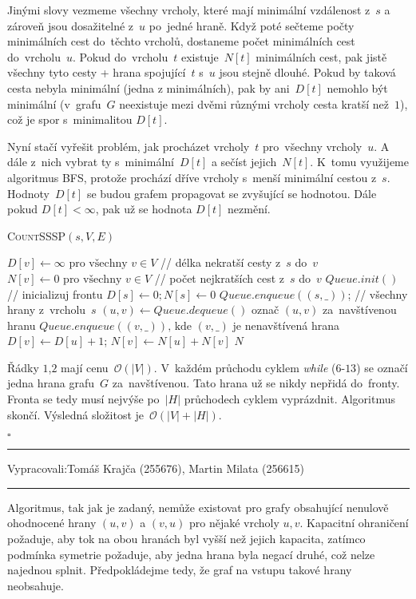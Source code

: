 \documentclass[12pt]{article}
\newcommand{\la}{\leftarrow}
\renewcommand{\O}{\mathcal{O}}
\newcommand{\zadani}[2]{
{\large
\noindent {\bf IB108 \hfill{} Sada #1, Příklad #2 \\[-4mm]}
\noindent\hrule
\vspace{2mm}
\noindent Vypracovali:\hfill{}Tomáš Krajča (255676), Martin Milata (256615)
\vspace{3mm}
\hrule
\bigskip\bigskip}
}
\begin{document}
\noindent
Jinými slovy vezmeme všechny vrcholy, které mají minimální vzdálenost z~$s$ a
zároveň jsou dosažitelné z~$u$ po~jedné hraně. Když poté sečteme počty
minimálních cest do~těchto vrcholů, dostaneme počet minimálních cest do~vrcholu~$u$. Pokud do~vrcholu~$t$ existuje~$N[t]$ minimálních cest, pak jistě všechny
tyto cesty + hrana spojující~$t$ s~$u$ jsou stejně dlouhé. Pokud by taková cesta
nebyla minimální (jedna z minimálních), pak by ani~$D[t]$ nemohlo být minimální
(v~grafu~$G$ neexistuje mezi dvěmi různými vrcholy cesta kratší než~$1$), což je
spor s~minimalitou $D[t]$.

\noindent
Nyní stačí vyřešit problém, jak procházet vrcholy~$t$ pro~všechny vrcholy~$u$. A dále z~nich vybrat ty s~minimální~$D[t]$ a sečíst jejich~$N[t]$. K~tomu
využijeme algoritmus \textsc{BFS}, protože prochází dříve vrcholy s~menší
minimální cestou z~$s$. Hodnoty~$D[t]$ se budou grafem propagovat se
zvyšující se hodnotou. Dále pokud $D[t] < \infty$, pak už se hodnota $D[t]$ nezmění.

\begin{algorithm}
\textsc{CountSSSP}$(s, V, E)$
\begin{algorithmic}[1]
\STATE $D[v] \la \infty \mbox{ pro všechny } v \in V$ // délka nekratší cesty z~$s$ do~$v$
\STATE $N[v] \la 0 \mbox{ pro všechny } v \in V$ // počet nejkratších cest z~$s$ do~$v$
\STATE $Queue.init()$ // inicializuj frontu
\STATE $D[s] \la 0; N[s] \la 0$
\STATE $Queue.enqueue((s,\_))$; // všechny hrany z~vrcholu~$s$
\STATE $(u,v) \la Queue.dequeue()$
\STATE označ $(u,v)$ za~navštívenou hranu
\STATE $Queue.enqueue((v,\_)) \mbox{, kde } (v,\_)$ je nenavštívená hrana
\STATE $D[v] \la D[u]+1$; $N[v] \la N[u] + N[v]$
\ENDIF
\ENDWHILE
\RETURN $N$
\end{algorithmic}
\end{algorithm}
Řádky $1$,$2$ mají cenu~$\O(|V|)$. V~každém průchodu cyklem
\textit{while} ($6$-$13$) se označí jedna hrana grafu~$G$ za~navštívenou. Tato
hrana už se nikdy nepřidá do~fronty. Fronta se tedy musí nejvýše po~$|H|$
průchodech cyklem vyprázdnit. Algoritmus skončí. Výsledná složitost je~$\O(|V|+|H|)$.

\hfill$\square$

\clearpage
\zadani{3}{3}

\noindent
Algoritmus, tak jak je zadaný, nemůže existovat pro grafy obsahující nenulově ohodnocené hrany $(u,v)$
a $(v,u)$ pro nějaké vrcholy $u,v$. Kapacitní ohraničení požaduje, aby tok na obou hranách byl vyšší než
jejich kapacita, zatímco podmínka symetrie požaduje, aby jedna hrana byla negací druhé, což nelze
najednou splnit. Předpokládejme tedy, že graf na vstupu takové hrany neobsahuje.
\end{document}
